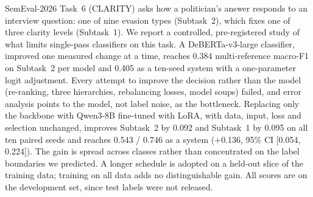 SemEval-2026 Task~6 (CLARITY) asks how a politician's answer responds to an interview question: one of nine evasion types (Subtask~2), which fixes one of three clarity levels (Subtask~1).
We report a controlled, pre-registered study of what limits single-pass classifiers on this task.
A DeBERTa-v3-large classifier, improved one measured change at a time, reaches 0.384 multi-reference macro-F1 on Subtask~2 per model and 0.405 as a ten-seed system with a one-parameter logit adjustment.
Every attempt to improve the decision rather than the model (re-ranking, three hierarchies, rebalancing losses, model soups) failed, and error analysis points to the model, not label noise, as the bottleneck.
Replacing only the backbone with Qwen3-8B fine-tuned with LoRA, with data, input, loss and selection unchanged, improves Subtask~2 by 0.092 and Subtask~1 by 0.095 on all ten paired seeds and reaches 0.543 / 0.746 as a system (+0.136, 95\% CI [0.054, 0.224]).
The gain is spread across classes rather than concentrated on the label boundaries we predicted.
A longer schedule is adopted on a held-out slice of the training data; training on all data adds no distinguishable gain.
All scores are on the development set, since test labels were not released.
